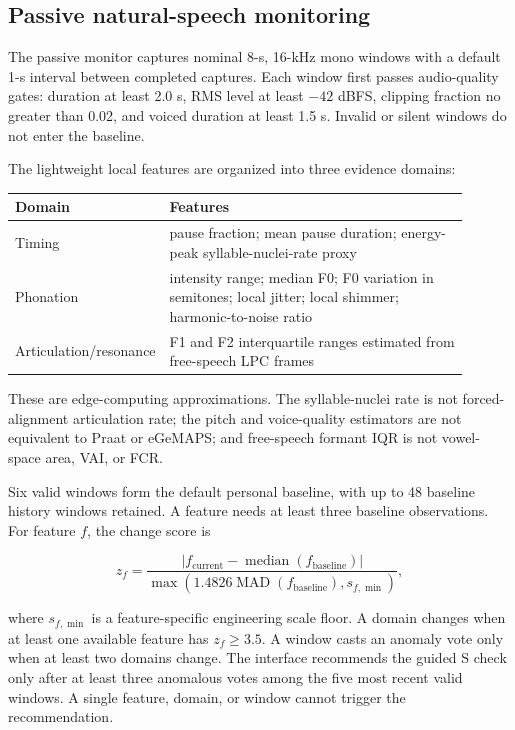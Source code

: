 \documentclass[11pt,a4paper]{article}
\begin{document}
\subsection{Passive natural-speech monitoring}

The passive monitor captures nominal 8-s, 16-kHz mono windows with a default 1-s interval between completed captures. Each window first passes audio-quality gates: duration at least 2.0 s, RMS level at least $-42$ dBFS, clipping fraction no greater than 0.02, and voiced duration at least 1.5 s. Invalid or silent windows do not enter the baseline.

The lightweight local features are organized into three evidence domains:

\begin{longtable}{p{0.22\linewidth}p{0.68\linewidth}}
\toprule
Domain & Features \\
\midrule
Timing & pause fraction; mean pause duration; energy-peak syllable-nuclei-rate proxy \\
Phonation & intensity range; median F0; F0 variation in semitones; local jitter; local shimmer; harmonic-to-noise ratio \\
Articulation/resonance & F1 and F2 interquartile ranges estimated from free-speech LPC frames \\
\bottomrule
\end{longtable}

These are edge-computing approximations. The syllable-nuclei rate is not forced-alignment articulation rate; the pitch and voice-quality estimators are not equivalent to Praat or eGeMAPS; and free-speech formant IQR is not vowel-space area, VAI, or FCR.

Six valid windows form the default personal baseline, with up to 48 baseline history windows retained. A feature needs at least three baseline observations. For feature $f$, the change score is

\begin{equation}
z_f=\frac{|f_{\mathrm{current}}-\operatorname{median}(f_{\mathrm{baseline}})|}
{\max\left(1.4826\operatorname{MAD}(f_{\mathrm{baseline}}),s_{f,\min}\right)},
\end{equation}

where $s_{f,\min}$ is a feature-specific engineering scale floor. A domain changes when at least one available feature has $z_f\geq3.5$. A window casts an anomaly vote only when at least two domains change. The interface recommends the guided S check only after at least three anomalous votes among the five most recent valid windows. A single feature, domain, or window cannot trigger the recommendation.
\end{document}
